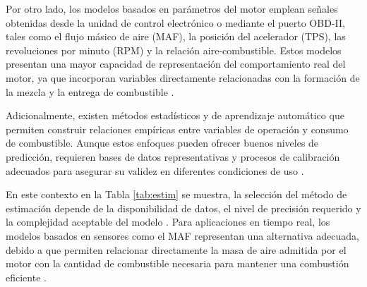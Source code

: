 Por otro lado, los modelos basados en parámetros del motor emplean señales obtenidas desde la unidad de control electrónico o mediante el puerto OBD-II, tales como el flujo másico de aire (MAF), la posición del acelerador (TPS), las revoluciones por minuto (RPM) y la relación aire-combustible. Estos modelos presentan una mayor capacidad de representación del comportamiento real del motor, ya que incorporan variables directamente relacionadas con la formación de la mezcla y la entrega de combustible \citep{MAFFuelConsumption2024, ResearchOBD2018}.

Adicionalmente, existen métodos estadísticos y de aprendizaje automático que permiten construir relaciones empíricas entre variables de operación y consumo de combustible. Aunque estos enfoques pueden ofrecer buenos niveles de predicción, requieren bases de datos representativas y procesos de calibración adecuados para asegurar su validez en diferentes condiciones de uso \citep{EstimatingRegression2018, ResearchOBD2018}.

En este contexto en la Tabla \ref{tab:estim} se muestra, la selección del método de estimación depende de la disponibilidad de datos, el nivel de precisión requerido y la complejidad aceptable del modelo . Para aplicaciones en tiempo real, los modelos basados en sensores como el MAF representan una alternativa adecuada, debido a que permiten relacionar directamente la masa de aire admitida por el motor con la cantidad de combustible necesaria para mantener una combustión eficiente \citep{MAFFuelConsumption2024, Bosch_GDI}.

